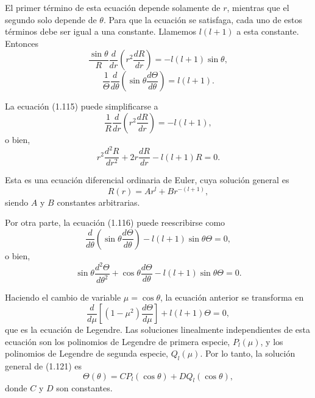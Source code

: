 \documentclass[12pt,a4paper]{book}
\begin{document}
El primer término de esta ecuación depende solamente de $r$, mientras que el segundo solo depende de $\theta$. Para que la ecuación se satisfaga, cada uno de estos términos debe ser igual a una constante. Llamemos $l(l+1)$ a esta constante. Entonces
\begin{equation}
\frac{\sin\theta}{R}\frac{d}{dr}\left(r^2\frac{dR}{dr}\right) = -l(l+1)\sin\theta,
\end{equation}
\begin{equation}
\frac{1}{\Theta}\frac{d}{d\theta}\left(\sin\theta\frac{d\Theta}{d\theta}\right) = l(l+1).
\end{equation}

La ecuación (1.115) puede simplificarse a
\begin{equation}
\frac{1}{R}\frac{d}{dr}\left(r^2\frac{dR}{dr}\right) = -l(l+1),
\end{equation}
o bien,
\begin{equation}
r^2\frac{d^2R}{dr^2} + 2r\frac{dR}{dr} - l(l+1)R = 0.
\end{equation}

Esta es una ecuación diferencial ordinaria de Euler, cuya solución general es
\begin{equation}
R(r) = Ar^l + Br^{-(l+1)},
\end{equation}
siendo $A$ y $B$ constantes arbitrarias.

Por otra parte, la ecuación (1.116) puede reescribirse como
\begin{equation}
\frac{d}{d\theta}\left(\sin\theta\frac{d\Theta}{d\theta}\right) - l(l+1)\sin\theta\Theta = 0,
\end{equation}
o bien,
\begin{equation}
\sin\theta\frac{d^2\Theta}{d\theta^2} + \cos\theta\frac{d\Theta}{d\theta} - l(l+1)\sin\theta\Theta = 0.
\end{equation}

Haciendo el cambio de variable $\mu = \cos\theta$, la ecuación anterior se transforma en
\begin{equation}
\frac{d}{d\mu}\left[(1-\mu^2)\frac{d\Theta}{d\mu}\right] + l(l+1)\Theta = 0,
\end{equation}
que es la ecuación de Legendre. Las soluciones linealmente independientes de esta ecuación son los polinomios de Legendre de primera especie, $P_l(\mu)$, y los polinomios de Legendre de segunda especie, $Q_l(\mu)$. Por lo tanto, la solución general de (1.121) es
\begin{equation}
\Theta(\theta) = CP_l(\cos\theta) + DQ_l(\cos\theta),
\end{equation}
donde $C$ y $D$ son constantes.
\end{document}
